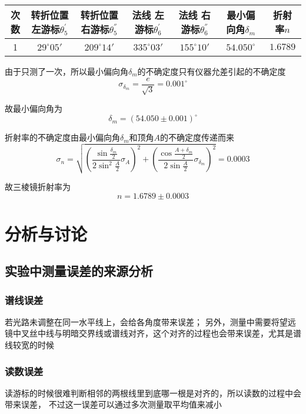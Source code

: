 \documentclass{article}
\newcommand{\degree}{^\circ}
\begin{document}
    \begin{center}    
        \begin{tabular}{|c|c|c|c|c|c|c|}
            \hline
            次数 & \makecell[c]{转折位置\\左游标$\theta_5^{'}$} & \makecell[c]{转折位置\\右游标$\theta_5^{''}$} & \makecell[c]{法线\\左游标$\theta_6^{'}$} & \makecell[c]{法线\\右游标$\theta_6^{''}$} & 最小偏向角$\delta_m$ & 折射率$n$ \\
            \hline
            1 & $29\degree05'$ & $209\degree14'$ & $335\degree03'$ & $155\degree10'$ & $54.050\degree$ & $1.6789$ \\
            \hline
        \end{tabular}
    \end{center}

    由于只测了一次，所以最小偏向角$\delta_m$的不确定度只有仪器允差引起的不确定度
    $$\sigma_{\delta_m} = \frac{e}{\sqrt{3}} = 0.001\degree$$

    故最小偏向角为
    $$\delta_m=(54.050\pm0.001)\degree$$

    折射率的不确定度由最小偏向角$\delta_m$和顶角$A$的不确定度传递而来
    $$\sigma_n = \sqrt{(\frac{\sin \frac{\delta_m}{2}}{2\sin^2 \frac{A}{2}}\sigma_A)^2 + (\frac{\cos \frac{A+\delta_m}{2}}{2\sin \frac{A}{2}}\sigma_{\delta_m})^2}=0.0003$$

    故三棱镜折射率为
    $$n=1.6789\pm0.0003$$

    \section{分析与讨论}
    
    \subsection{实验中测量误差的来源分析}
    
    \subsubsection{谱线误差}
    若光路未调整在同一水平线上，会给各角度带来误差；
    另外，测量中需要将望远镜中叉丝中线与明暗交界线或谱线对齐，这个对齐的过程也会带来误差，尤其是谱线较宽的时候

    \subsubsection{读数误差}
    读游标的时候很难判断相邻的两根线里到底哪一根是对齐的，所以读数的过程中会带来误差，
    不过这一误差可以通过多次测量取平均值来减小
\end{document}
